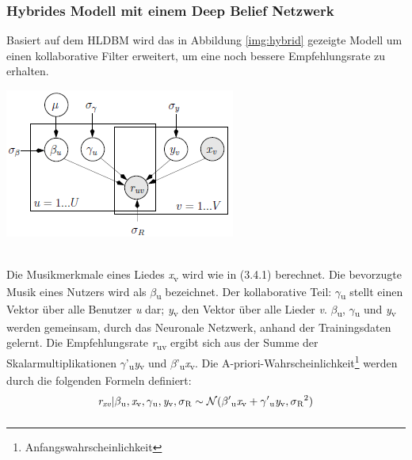 \documentclass[twosided,a4,10pt]{article}
\begin{document}
\begin{multicols}{2}
		\subsubsection{Hybrides Modell mit einem Deep Belief Netzwerk}
		Basiert auf dem HLDBM wird das in Abbildung \ref{img:hybrid} gezeigte Modell um einen kollaborative Filter erweitert, um eine noch bessere Empfehlungsrate zu erhalten.
		\begin{minipage}{0.45\textwidth}
			\centering
			\includegraphics{img/hybrid.png}
			\label{img:hybrid}
		\end{minipage}\newline\\
		Die Musikmerkmale eines Liedes \textit{x}\textsubscript{v} wird wie in (3.4.1) berechnet. Die bevorzugte Musik eines Nutzers wird als $\beta$\textsubscript{u} bezeichnet. Der kollaborative Teil: $\gamma$\textsubscript{u} stellt einen Vektor über alle Benutzer \textit{u} dar; \textit{y}\textsubscript{v} den Vektor über alle Lieder \textit{v}. $\beta$\textsubscript{u}, $\gamma$\textsubscript{u} und \textit{y}\textsubscript{v} werden gemeinsam, durch das Neuronale Netzwerk, anhand der Trainingsdaten gelernt. Die Empfehlungsrate \textit{r}\textsubscript{uv} ergibt sich aus der Summe der Skalarmultiplikationen  $\gamma$'\textsubscript{u}\textit{y}\textsubscript{v} und  $\beta$'\textsubscript{u}\textit{x}\textsubscript{v}. Die A-priori-Wahrscheinlichkeit\footnote[20]{Anfangswahrscheinlichkeit} werden durch die folgenden Formeln definiert:\newline
		\begin{equation*}
		\centering
		\textit{r\textsubscript{xv}}|\beta\textsubscript{u},\textit{x}\textsubscript{v},\gamma\textsubscript{u},\textit{y}\textsubscript{v},\sigma\textsubscript{R}\sim\mathcal{N}(\beta'\textsubscript{u}\textit{x}\textsubscript{v} + \gamma'\textsubscript{u}\textit{y}\textsubscript{v},\sigma\textsubscript{R}\textsuperscript{2})
		\end{equation*}
		\begin{equation*}

\end{equation*}
\end{multicols}
\end{document}
